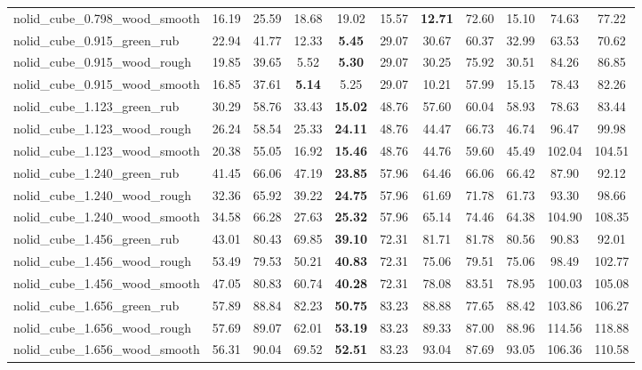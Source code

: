 \begin{table}[H]
{\begin{tabular}{l cccccccccc}
        nolid\_cube\_0.798\_wood\_smooth & 16.19 & 25.59 & 18.68 & 19.02 & 15.57 & \textbf{12.71} & 72.60 & 15.10 & 74.63 & 77.22 \\
        nolid\_cube\_0.915\_green\_rub & 22.94 & 41.77 & 12.33 & \textbf{5.45} & 29.07 & 30.67 & 60.37 & 32.99 & 63.53 & 70.62 \\
        nolid\_cube\_0.915\_wood\_rough & 19.85 & 39.65 & 5.52 & \textbf{5.30} & 29.07 & 30.25 & 75.92 & 30.51 & 84.26 & 86.85 \\
        nolid\_cube\_0.915\_wood\_smooth & 16.85 & 37.61 & \textbf{5.14} & 5.25 & 29.07 & 10.21 & 57.99 & 15.15 & 78.43 & 82.26 \\
        nolid\_cube\_1.123\_green\_rub & 30.29 & 58.76 & 33.43 & \textbf{15.02} & 48.76 & 57.60 & 60.04 & 58.93 & 78.63 & 83.44 \\
        nolid\_cube\_1.123\_wood\_rough & 26.24 & 58.54 & 25.33 & \textbf{24.11} & 48.76 & 44.47 & 66.73 & 46.74 & 96.47 & 99.98 \\
        nolid\_cube\_1.123\_wood\_smooth & 20.38 & 55.05 & 16.92 & \textbf{15.46} & 48.76 & 44.76 & 59.60 & 45.49 & 102.04 & 104.51 \\
        nolid\_cube\_1.240\_green\_rub & 41.45 & 66.06 & 47.19 & \textbf{23.85} & 57.96 & 64.46 & 66.06 & 66.42 & 87.90 & 92.12 \\
        nolid\_cube\_1.240\_wood\_rough & 32.36 & 65.92 & 39.22 & \textbf{24.75} & 57.96 & 61.69 & 71.78 & 61.73 & 93.30 & 98.66 \\
        nolid\_cube\_1.240\_wood\_smooth & 34.58 & 66.28 & 27.63 & \textbf{25.32} & 57.96 & 65.14 & 74.46 & 64.38 & 104.90 & 108.35 \\
        nolid\_cube\_1.456\_green\_rub & 43.01 & 80.43 & 69.85 & \textbf{39.10} & 72.31 & 81.71 & 81.78 & 80.56 & 90.83 & 92.01 \\
        nolid\_cube\_1.456\_wood\_rough & 53.49 & 79.53 & 50.21 & \textbf{40.83} & 72.31 & 75.06 & 79.51 & 75.06 & 98.49 & 102.77 \\
        nolid\_cube\_1.456\_wood\_smooth & 47.05 & 80.83 & 60.74 & \textbf{40.28} & 72.31 & 78.08 & 83.51 & 78.95 & 100.03 & 105.08 \\
        nolid\_cube\_1.656\_green\_rub & 57.89 & 88.84 & 82.23 & \textbf{50.75} & 83.23 & 88.88 & 77.65 & 88.42 & 103.86 & 106.27 \\
        nolid\_cube\_1.656\_wood\_rough & 57.69 & 89.07 & 62.01 & \textbf{53.19} & 83.23 & 89.33 & 87.00 & 88.96 & 114.56 & 118.88 \\
        nolid\_cube\_1.656\_wood\_smooth & 56.31 & 90.04 & 69.52 & \textbf{52.51} & 83.23 & 93.04 & 87.69 & 93.05 & 106.36 & 110.58 \\

\end{tabular}}
\end{table}
